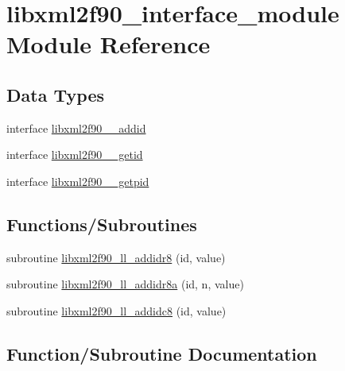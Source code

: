 \hypertarget{namespacelibxml2f90__interface__module}{}\section{libxml2f90\+\_\+interface\+\_\+module Module Reference}
\label{namespacelibxml2f90__interface__module}
\subsection*{Data Types}
\begin{DoxyCompactItemize}
\item 
interface \hyperlink{interfacelibxml2f90__interface__module_1_1libxml2f90____addid}{libxml2f90\+\_\+\+\_\+addid}
\item 
interface \hyperlink{interfacelibxml2f90__interface__module_1_1libxml2f90____getid}{libxml2f90\+\_\+\+\_\+getid}
\item 
interface \hyperlink{interfacelibxml2f90__interface__module_1_1libxml2f90____getpid}{libxml2f90\+\_\+\+\_\+getpid}
\end{DoxyCompactItemize}
\subsection*{Functions/\+Subroutines}
\begin{DoxyCompactItemize}
\item 
subroutine \hyperlink{namespacelibxml2f90__interface__module_a74e6744ce3a60bdf75d94db9e9683fa8}{libxml2f90\+\_\+ll\+\_\+addidr8} (id, value)
\item 
subroutine \hyperlink{namespacelibxml2f90__interface__module_a2532faf7ac758a77d95784b4bf95e13d}{libxml2f90\+\_\+ll\+\_\+addidr8a} (id, n, value)
\item 
subroutine \hyperlink{namespacelibxml2f90__interface__module_a3bfde8cab194dab3ca706c4363bd4cf2}{libxml2f90\+\_\+ll\+\_\+addidc8} (id, value)
\end{DoxyCompactItemize}


\subsection{Function/\+Subroutine Documentation}
\hypertarget{namespacelibxml2f90__interface__module_a3bfde8cab194dab3ca706c4363bd4cf2}{}
